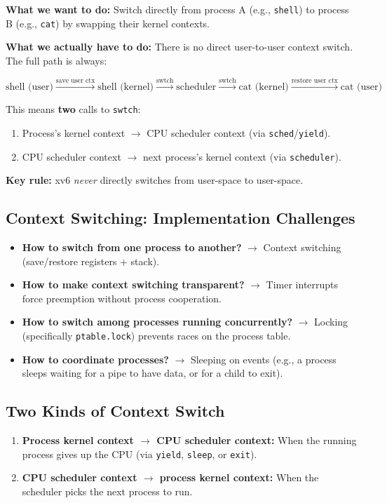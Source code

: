 \documentclass[11pt]{article}
\begin{document}
\textbf{What we want to do:} Switch directly from process A (e.g., \texttt{shell}) to process B (e.g., \texttt{cat}) by swapping their kernel contexts.

\textbf{What we actually have to do:} There is no direct user-to-user context switch. The full path is always:

\[
\text{shell (user)} \xrightarrow{\text{save user ctx}} \text{shell (kernel)} \xrightarrow{\text{swtch}} \text{scheduler} \xrightarrow{\text{swtch}} \text{cat (kernel)} \xrightarrow{\text{restore user ctx}} \text{cat (user)}
\]

This means \textbf{two} calls to \texttt{swtch}:
\begin{enumerate}
    \item Process's kernel context $\to$ CPU scheduler context (via \texttt{sched}/\texttt{yield}).
    \item CPU scheduler context $\to$ next process's kernel context (via \texttt{scheduler}).
\end{enumerate}

\textbf{Key rule:} xv6 \emph{never} directly switches from user-space to user-space.

\subsection{Context Switching: Implementation Challenges}

\begin{itemize}
    \item \textbf{How to switch from one process to another?} $\to$ Context switching (save/restore registers + stack).
    \item \textbf{How to make context switching transparent?} $\to$ Timer interrupts force preemption without process cooperation.
    \item \textbf{How to switch among processes running concurrently?} $\to$ Locking (specifically \texttt{ptable.lock}) prevents races on the process table.
    \item \textbf{How to coordinate processes?} $\to$ Sleeping on events (e.g., a process sleeps waiting for a pipe to have data, or for a child to exit).
\end{itemize}

\subsection{Two Kinds of Context Switch}

\begin{enumerate}
    \item \textbf{Process kernel context $\to$ CPU scheduler context:} When the running process gives up the CPU (via \texttt{yield}, \texttt{sleep}, or \texttt{exit}).
    \item \textbf{CPU scheduler context $\to$ process kernel context:} When the scheduler picks the next process to run.
\end{enumerate}
\end{document}
